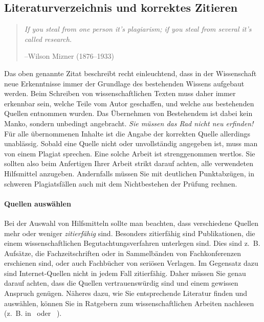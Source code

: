 \subsection{Literaturverzeichnis und korrektes Zitieren}
\label{sec:zitieren}

\begin{quote}
\textit{If you steal from one person it's plagiarism; if you steal from several it's called research.}
\vspace*{-4eX}$\ $
\begin{flushright}
    \small{--Wilson Mizner (1876–1933)}
\end{flushright}
\end{quote}

Das oben genannte Zitat beschreibt recht einleuchtend, dass in der Wissenschaft neue Erkenntnisse immer der Grundlage des bestehenden Wissens aufgebaut werden.
Beim Schreiben von wissenschaftlichen Texten muss daher immer erkennbar sein, welche Teile vom Autor geschaffen, und welche aus bestehenden Quellen entnommen wurden.
Das Übernehmen von Bestehendem ist dabei kein Manko, sondern unbedingt angebracht.
\textit{Sie müssen das Rad nicht neu erfinden!}
Für alle übernommenen Inhalte ist die Angabe der korrekten Quelle allerdings unablässig.
Sobald eine Quelle nicht oder unvollständig angegeben ist, muss man von einem Plagiat sprechen.
Eine solche Arbeit ist strenggenommen wertlos.
Sie sollten also beim Anfertigen Ihrer Arbeit strikt darauf achten, alle verwendeten Hilfsmittel anzugeben.
Andernfalls müssen Sie mit deutlichen Punktabzügen, in schweren Plagiatsfällen auch mit dem Nichtbestehen der Prüfung rechnen.

\paragraph{Quellen auswählen}

Bei der Auswahl von Hilfsmitteln sollte man beachten, dass verschiedene Quellen mehr oder weniger \textit{zitierfähig} sind.
Besonders zitierfähig sind Publikationen, die einem wissenschaftlichen Begutachtungsverfahren unterlegen sind.
Dies sind z.~B. Aufsätze, die Fachzeitschriften oder in Sammelbänden von Fachkonferenzen erschienen sind, oder auch Fachbücher von seriösen Verlagen.
Im Gegensatz dazu sind Internet-Quellen nicht in jedem Fall zitierfähig.
Daher müssen Sie genau darauf achten, dass die Quellen vertrauenswürdig sind und einem gewissen Anspruch genügen.
Näheres dazu, wie Sie entsprechende Literatur finden und auswählen, können Sie in Ratgebern zum wissenschaftlichen Arbeiten nachlesen (z.~B. in~\cite{Kremer2018} oder ~\cite{Kollmann2016}).

